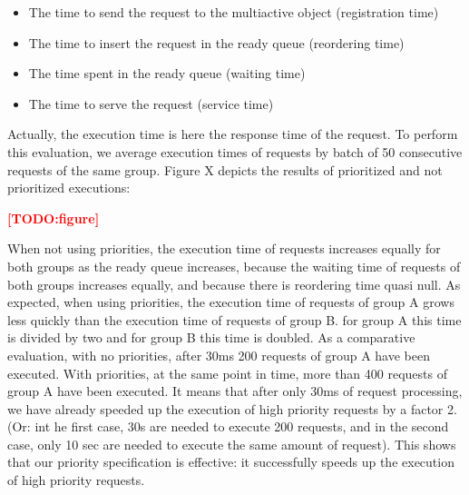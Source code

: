 \documentclass[11pt]{report}
\newcommand{\TODO}[1]{\textcolor{red}{\textbf{[TODO:#1]}}}
\begin{document}
\begin{itemize}
\item The time to send the request to the multiactive object (registration time)
\item The time to insert the request in the ready queue (reordering time)
\item The time spent in the ready queue (waiting time)
\item The time to serve the request (service time)
\end{itemize}

Actually, the execution time is here the response time of the request. To perform this evaluation, we average execution times of requests by batch of 50 consecutive requests of the same group. Figure X depicts the results of prioritized and not prioritized executions:

\TODO{figure}

When not using priorities, the execution time of requests increases equally for both groups as the ready queue increases, because the waiting time of requests of both groups increases equally, and because there is reordering time quasi null. As expected, when using priorities, the execution time of requests of group A grows less quickly than the execution time of requests of group B. for group A this time is divided by two and for group B this time is doubled. As a comparative evaluation, with no priorities, after 30ms 200 requests of group A have been executed. With priorities, at the same point in time, more than 400 requests of group A have been executed. It means that after only 30ms of request processing, we have already speeded up the execution of high priority requests by a factor 2. (Or: int he first case, 30s are needed to execute 200 requests, and in the second case, only 10 sec are needed to execute the same amount of request). This shows that our priority specification is effective: it successfully speeds up the execution of high priority requests. 
\end{document}

